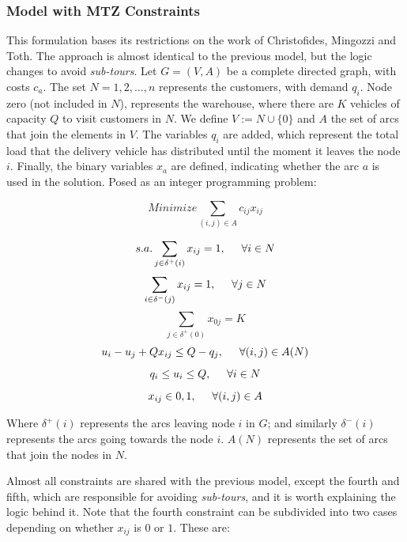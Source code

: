 \documentclass{amsart}
\begin{document}
            \subsubsection*{Model with MTZ Constraints \parencite{Larraín2021, florez2017}}
            This formulation bases its restrictions on the work of Christofides, Mingozzi and Toth. The approach is almost identical to the previous model, but the logic changes to avoid \textit{sub-tours}. Let $G=(V, A)$ be a complete directed graph, with costs $c_a$. The set $N={1, 2, \ldots , n}$ represents the customers, with demand $q_i$. Node zero (not included in $N$), represents the warehouse, where there are $K$ vehicles of capacity $Q$ to visit customers in $N$. We define $V:=N \cup \{0\}$ and $A$ the set of arcs that join the elements in $V$. The variables $q_i$ are added, which represent the total load that the delivery vehicle has distributed until the moment it leaves the node $i$. Finally, the binary variables $x_a$ are defined, indicating whether the arc $a$ is used in the solution. Posed as an integer programming problem:

            \begin{equation}
                Minimize \sum_{(i, j) \in A} c_{ij} x_{ij}
            \end{equation}

            \[s.a. \sum_{j \in \delta^+ (i)} x_{ij} = 1, \hspace{0.5cm} \forall i \in N\]
            \[\sum_{i \in \delta^- (j)} x_{ij} = 1, \hspace{0.5cm} \forall j \in N\]
            \[\sum_{j \in \delta^+ (0)} x_{0j} = K\]
            \[u_i - u_j + Qx_{ij} \leq Q - q_j, \hspace{0.5cm} \forall (i, j) \in A(N)\]
            \[q_i \leq u_i \leq Q, \hspace{0.5cm} \forall i \in N\]
            \[x_{ij} \in {0, 1}, \hspace{0.5cm} \forall (i, j) \in A\]

            Where $\delta^+ (i)$ represents the arcs leaving node $i$ in $G$; and similarly $\delta^- (i)$ represents the arcs going towards the node $i$. $A(N)$ represents the set of arcs that join the nodes in $N$.

            Almost all constraints are shared with the previous model, except the fourth and fifth, which are responsible for avoiding \textit{sub-tours}, and it is worth explaining the logic behind it. Note that the fourth constraint can be subdivided into two cases depending on whether $x_{ij}$ is $0$ or $1$. These are:
\end{document}
